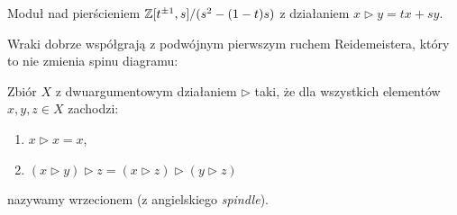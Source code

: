 \begin{example}
    Moduł nad pierścieniem $\mathbb Z[t^{\pm 1}, s]/(s^2 - (1-t)s)$ z działaniem $x \triangleright y = tx+sy$.
\end{example}

Wraki dobrze współgrają z podwójnym pierwszym ruchem Reidemeistera, który to nie zmienia spinu diagramu:
\begin{comment}
\[
    \begin{tikzpicture}[baseline=-0.65ex,scale=0.07]
    \begin{knot}[clip width=5,flip crossing/.list={1}]
        \strand[semithick] (15, 0) [in=up,out=left] to (-5, -7);
        \strand[semithick] (-5, -7) [in=down,out=down] to (5, -7);
        \strand[semithick] (5, -7) [in=right,out=up] to (-15, 0);
        \strand[semithick,Latex-] (45, 0) [in=up,out=left] to (25, -7);
        \strand[semithick] (25, -7) [in=down,out=down] to (35, -7);
        \strand[semithick] (35, -7) [in=right,out=up] to (15, 0);
        \node[darkblue] at (-15, 0)[left] {$x$};
        \node[darkblue] at (15, 0)[above] {$x \triangleright x$};
        \node[darkblue] at (45, 0)[right] {$x$};
    \end{knot}
    \end{tikzpicture}
    \cong
    \begin{tikzpicture}[baseline=-0.65ex,scale=0.07]
    \begin{knot}[clip width=5]
        \strand[semithick,-Latex] (-15, 0) to (15, 0);
        \node[darkblue] at (-15, 0)[left] {$x$};
    \end{knot}
    \end{tikzpicture}
\]
\end{comment}

\begin{definition}[wrzeciono]
    Zbiór $X$ z dwuargumentowym działaniem $\triangleright$ taki, że dla wszystkich elementów $x, y, z \in X$ zachodzi:
    \begin{enumerate}
        \item $x \triangleright x = x$,
        \item $(x \triangleright y) \triangleright z = (x \triangleright z) \triangleright (y \triangleright z)$
    \end{enumerate}
    nazywamy wrzecionem (z angielskiego \emph{spindle}).
\end{definition}

